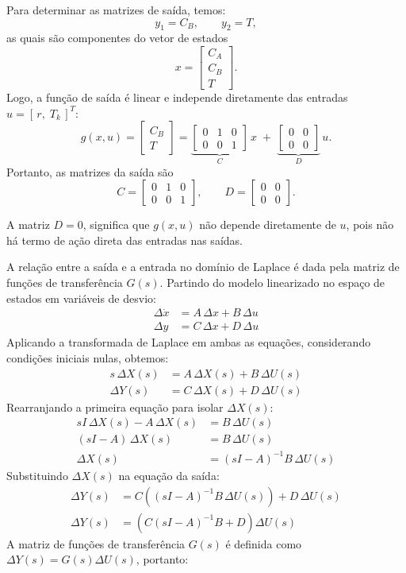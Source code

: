 \documentclass{article}
\begin{document}
Para determinar as matrizes de saída, temos:
\[
y_1 = C_B, \qquad y_2 = T,
\]
as quais são componentes do vetor de estados
\[
x = \begin{bmatrix} C_A \\ C_B \\ T \end{bmatrix}.
\]
Logo, a função de saída é linear e independe diretamente das entradas $u = [\,r,\;T_k\,]^T$:
\[
g(x,u) = \begin{bmatrix} C_B \\ T \end{bmatrix}
= \underbrace{\begin{bmatrix} 0 & 1 & 0 \\[3pt] 0 & 0 & 1 \end{bmatrix}}_{C}\,x
\;+\; \underbrace{\begin{bmatrix} 0 & 0 \\[3pt] 0 & 0 \end{bmatrix}}_{D}\,u.
\]
Portanto, as matrizes da saída são
\[
C = \begin{bmatrix} 0 & 1 & 0 \\[3pt] 0 & 0 & 1 \end{bmatrix}, 
\qquad
D = \begin{bmatrix} 0 & 0 \\[3pt] 0 & 0 \end{bmatrix}.
\]

A matriz $D = 0$, significa que $g(x,u)$ não depende diretamente de $u$, pois não há termo de ação direta das entradas nas saídas.

A relação entre a saída e a entrada no domínio de Laplace é dada pela matriz de funções de transferência $G(s)$. Partindo do modelo linearizado no espaço de estados em variáveis de desvio:
\begin{align*}
\Delta\dot{x} &= A\,\Delta x + B\,\Delta u \\
\Delta y &= C\,\Delta x + D\,\Delta u
\end{align*}
Aplicando a transformada de Laplace em ambas as equações, considerando condições iniciais nulas, obtemos:
\begin{align*}
s\,\Delta X(s) &= A\,\Delta X(s) + B\,\Delta U(s) \\
\Delta Y(s) &= C\,\Delta X(s) + D\,\Delta U(s)
\end{align*}
Rearranjando a primeira equação para isolar $\Delta X(s)$:
\begin{align*}
sI\,\Delta X(s) - A\,\Delta X(s) &= B\,\Delta U(s) \\
(sI - A)\,\Delta X(s) &= B\,\Delta U(s) \\
\Delta X(s) &= (sI - A)^{-1} B\,\Delta U(s)
\end{align*}
Substituindo $\Delta X(s)$ na equação da saída:
\begin{align*}
\Delta Y(s) &= C \left( (sI - A)^{-1} B\,\Delta U(s) \right) + D\,\Delta U(s) \\
\Delta Y(s) &= \left( C(sI - A)^{-1} B + D \right) \Delta U(s)
\end{align*}
A matriz de funções de transferência $G(s)$ é definida como $\Delta Y(s) = G(s) \Delta U(s)$, portanto:
\end{document}
